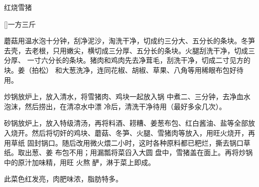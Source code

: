\begin{recipe}{红烧雪猪}

\ingredients

[\footnotemark]{一方三斤}

\preparation

\step 蘑菇用温水泡十分钟，刮净泥沙，淘洗干净，切成约三分大、五分长的条块。冬笋
去壳，去老根，只用嫩尖，横切成三分厚、五分长的条块。火腿刮洗干净，切成三分厚、
一寸六分长的条块。猪肉和鸡肉先去净茸毛，刮洗干净，切成二寸见方的块。姜（拍松）
和大葱洗净，连同花椒、胡椒、草果、八角等用稀眼布包好待用。

\step 炒锅放炉上，放入清水，将雪猪肉、鸡块一起放入锅 中煮二、三分钟，去净血水
泡沫，然后捞出，在清凉水中漂 冷后，清洗干净待用（最好多汆几次）。

\step 砂锅放炉上，放入特级清汤，再将料酒、耢糟、姜葱布包、红白酱油、盐等全部放
入烧开。然后将切奸的鸡块、蘑菇、冬笋、火腿、雪猪肉等放入，用旺火烧开，再用草纸
固封锅口。随后改用微火煨二小时，这时各种原料都已粑烂，撕去锅口草纸。取出葱、姜
布包不用；用漏瓢将菜舀入大圆 盘中，雪猪盖在面上。再将炒锅中的原汁加味精，用旺
火熬 酽，淋于菜上即成。

\features

此菜色红发亮，肉肥味浓，脂肪特多。


\end{recipe}

